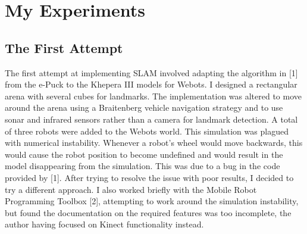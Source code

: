 \section{My Experiments}
\subsection{The First Attempt}
The first attempt at implementing SLAM involved adapting the algorithm in [1] from the e-Puck to the Khepera III models for Webots.  I designed a rectangular arena with several cubes for landmarks.  The implementation was altered to move around the arena using a Braitenberg vehicle navigation strategy and to use sonar and infrared sensors rather than a camera for landmark detection.  A total of three robots were added to the Webots world.  This simulation was plagued with numerical instability.  
Whenever a robot’s wheel would move backwards, this would cause the robot position to become undefined and would result in the model disappearing from the simulation.  This was due to a bug in the code provided by [1].  After trying to resolve the issue with poor results, I decided to try a different approach.  I also worked briefly with the Mobile Robot Programming Toolbox [2], attempting to work around the simulation instability, but found the documentation on the required features was too incomplete, the author having focused on Kinect functionality instead.

